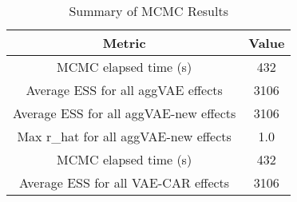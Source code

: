 
\begin{table}[h!]
\centering
\begin{tabular}{|c|c|}
\hline
\textbf{Metric} & \textbf{Value} \\
\hline
MCMC elapsed time (s) & 432 \\
\hline
Average ESS for all aggVAE effects & 3106 \\
\hline
Average ESS for all aggVAE-new effects & 3106 \\
\hline
Max r\_hat for all aggVAE-new effects & 1.0 \\
\hline
MCMC elapsed time (s) & 432 \\
\hline
Average ESS for all VAE-CAR effects & 3106 \\
\hline
\end{tabular}
\caption{Summary of MCMC Results}
\label{table:mcmc_summary}
\end{table}
